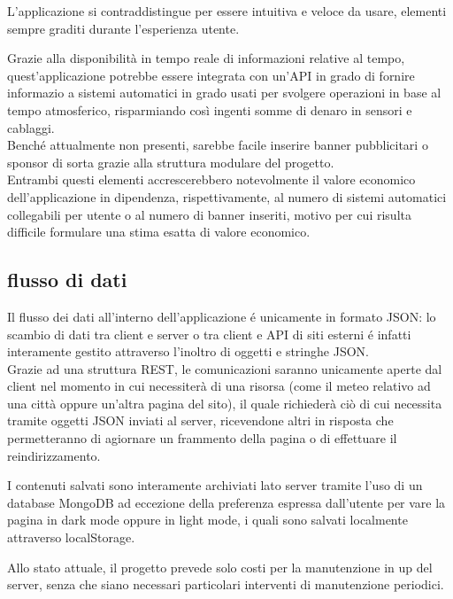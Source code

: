 L'applicazione si contraddistingue per essere intuitiva e veloce da usare, elementi sempre graditi durante l'esperienza utente.

\vspace{5mm}

Grazie alla disponibilità in tempo reale di informazioni relative al tempo, quest'applicazione potrebbe essere integrata con 
un'API in grado di fornire informazio a sistemi automatici in grado usati per svolgere operazioni in base al tempo atmosferico, 
risparmiando così ingenti somme di denaro in sensori e cablaggi.\\
Benché attualmente non presenti, sarebbe facile inserire banner pubblicitari o sponsor di sorta grazie alla struttura modulare 
del progetto.\\
Entrambi questi elementi accrescerebbero notevolmente il valore economico dell'applicazione in dipendenza, rispettivamente, al 
numero di sistemi automatici collegabili per utente o al numero di banner inseriti, motivo per cui risulta difficile formulare 
una stima esatta di valore economico.

\subsection{flusso di dati}

Il flusso dei dati all'interno dell'applicazione é unicamente in formato JSON: lo scambio di dati tra client e server o tra 
client e API di siti esterni é infatti interamente gestito attraverso l'inoltro di oggetti e stringhe JSON.\\
Grazie ad una struttura REST, le comunicazioni saranno unicamente aperte dal client nel momento in cui necessiterà di una risorsa 
(come il meteo relativo ad una città oppure un'altra pagina del sito), il quale richiederà ciò di cui necessita tramite 
oggetti JSON inviati al server, ricevendone altri in risposta che permetteranno di agiornare un frammento della pagina o di effettuare 
il reindirizzamento.

\vspace{5mm}

I contenuti salvati sono interamente archiviati lato server tramite l'uso di un database MongoDB ad eccezione della preferenza 
espressa dall'utente per vare la pagina in dark mode oppure in light mode, i quali sono salvati localmente attraverso 
localStorage.

\vspace{5mm}

Allo stato attuale, il progetto prevede solo costi per la manutenzione in up del server, senza che siano necessari particolari 
interventi di manutenzione periodici. 

